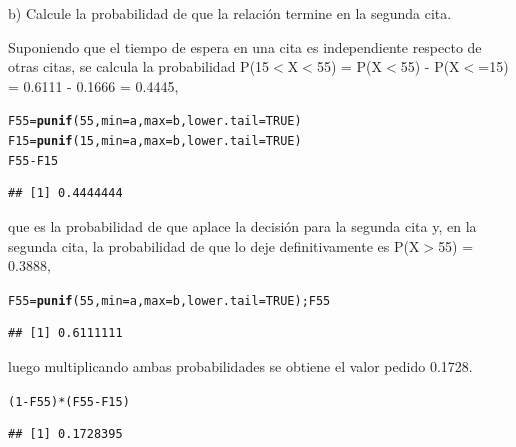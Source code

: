 \documentclass[12pt,letterpaper]{article}\usepackage[]{graphicx}\usepackage[]{color}
\makeatletter
\newcommand{\hlnum}[1]{\textcolor[rgb]{0.686,0.059,0.569}{#1}}%
\newcommand{\hlopt}[1]{\textcolor[rgb]{0,0,0}{#1}}%
\newcommand{\hlstd}[1]{\textcolor[rgb]{0.345,0.345,0.345}{#1}}%
\newcommand{\hlkwb}[1]{\textcolor[rgb]{0.69,0.353,0.396}{#1}}%
\newcommand{\hlkwc}[1]{\textcolor[rgb]{0.333,0.667,0.333}{#1}}%
\newcommand{\hlkwd}[1]{\textcolor[rgb]{0.737,0.353,0.396}{\textbf{#1}}}%
\newenvironment{kframe}{%
 \def\at@end@of@kframe{}%
 \ifinner\ifhmode%
  \def\at@end@of@kframe{\end{minipage}}%
  \begin{minipage}{\columnwidth}%
 \fi\fi%
 \def\FrameCommand##1{\hskip\@totalleftmargin \hskip-\fboxsep
 \colorbox{shadecolor}{##1}\hskip-\fboxsep
     \hskip-\linewidth \hskip-\@totalleftmargin \hskip\columnwidth}%
 \MakeFramed {\advance\hsize-\width
   \@totalleftmargin\z@ \linewidth\hsize
   \@setminipage}}%
 {\par\unskip\endMakeFramed%
 \at@end@of@kframe}
\newenvironment{knitrout}{}{} %
\makeatother
\begin{document}
\begin{description}
  \item b) Calcule la probabilidad de que la relaci\'on termine en la segunda cita.
  
Suponiendo que el tiempo de espera en una cita es independiente respecto de otras citas, se calcula la probabilidad P(15$<$X$<$55) = P(X$<$55) - P(X$<$=15) = 0.6111 - 0.1666 = 0.4445,
\begin{knitrout}
\color{fgcolor}\begin{kframe}
\begin{alltt}
\hlstd{F55}\hlkwb{=}\hlkwd{punif}\hlstd{(}\hlnum{55}\hlstd{,} \hlkwc{min}\hlstd{=a,} \hlkwc{max}\hlstd{=b,} \hlkwc{lower.tail}\hlstd{=}\hlnum{TRUE}\hlstd{)}
\hlstd{F15}\hlkwb{=}\hlkwd{punif}\hlstd{(}\hlnum{15}\hlstd{,} \hlkwc{min}\hlstd{=a,} \hlkwc{max}\hlstd{=b,} \hlkwc{lower.tail}\hlstd{=}\hlnum{TRUE}\hlstd{)}
\hlstd{F55}\hlopt{-}\hlstd{F15}
\end{alltt}
\begin{verbatim}
## [1] 0.4444444
\end{verbatim}
\end{kframe}
\end{knitrout}
\end{description}
que es la probabilidad de que aplace la decisi\'on para la segunda cita y, en la segunda cita, la probabilidad de que lo deje definitivamente es P(X$>$55) = 0.3888,
\begin{knitrout}
\color{fgcolor}\begin{kframe}
\begin{alltt}
\hlstd{F55}\hlkwb{=}\hlkwd{punif}\hlstd{(}\hlnum{55}\hlstd{,} \hlkwc{min}\hlstd{=a,} \hlkwc{max}\hlstd{=b,} \hlkwc{lower.tail}\hlstd{=}\hlnum{TRUE}\hlstd{);F55}
\end{alltt}
\begin{verbatim}
## [1] 0.6111111
\end{verbatim}
\end{kframe}
\end{knitrout}
luego multiplicando ambas probabilidades se obtiene el valor pedido 0.1728.
\begin{knitrout}
\color{fgcolor}\begin{kframe}
\begin{alltt}
\hlstd{(}\hlnum{1}\hlopt{-}\hlstd{F55)}\hlopt{*}\hlstd{( F55}\hlopt{-}\hlstd{F15)}
\end{alltt}
\begin{verbatim}
## [1] 0.1728395
\end{verbatim}
\end{kframe}
\end{knitrout}
\end{document}
